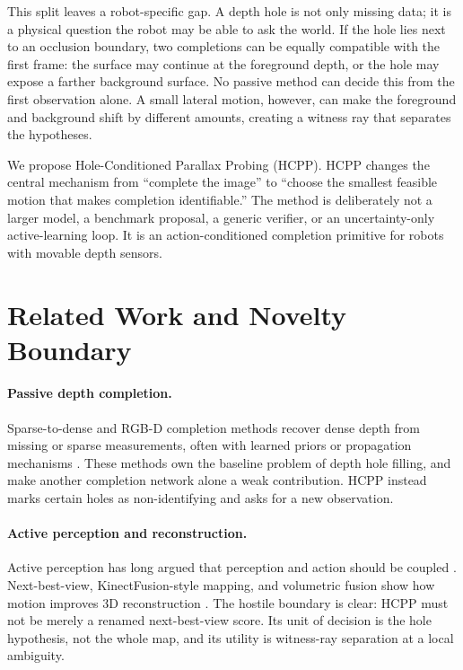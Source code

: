 \documentclass{article}
\begin{document}
This split leaves a robot-specific gap. A depth hole is not only missing data; it is a physical question the robot may be able to ask the world. If the hole lies next to an occlusion boundary, two completions can be equally compatible with the first frame: the surface may continue at the foreground depth, or the hole may expose a farther background surface. No passive method can decide this from the first observation alone. A small lateral motion, however, can make the foreground and background shift by different amounts, creating a witness ray that separates the hypotheses.

We propose Hole-Conditioned Parallax Probing (HCPP). HCPP changes the central mechanism from ``complete the image'' to ``choose the smallest feasible motion that makes completion identifiable.'' The method is deliberately not a larger model, a benchmark proposal, a generic verifier, or an uncertainty-only active-learning loop. It is an action-conditioned completion primitive for robots with movable depth sensors.

\section{Related Work and Novelty Boundary}
\paragraph{Passive depth completion.}
Sparse-to-dense and RGB-D completion methods recover dense depth from missing or sparse measurements, often with learned priors or propagation mechanisms \citep{ma2018sparse}. These methods own the baseline problem of depth hole filling, and make another completion network alone a weak contribution. HCPP instead marks certain holes as non-identifying and asks for a new observation.

\paragraph{Active perception and reconstruction.}
Active perception has long argued that perception and action should be coupled \citep{bajcsy1988active}. Next-best-view, KinectFusion-style mapping, and volumetric fusion show how motion improves 3D reconstruction \citep{curless1996volumetric,newcombe2011kinectfusion}. The hostile boundary is clear: HCPP must not be merely a renamed next-best-view score. Its unit of decision is the hole hypothesis, not the whole map, and its utility is witness-ray separation at a local ambiguity.
\end{document}
